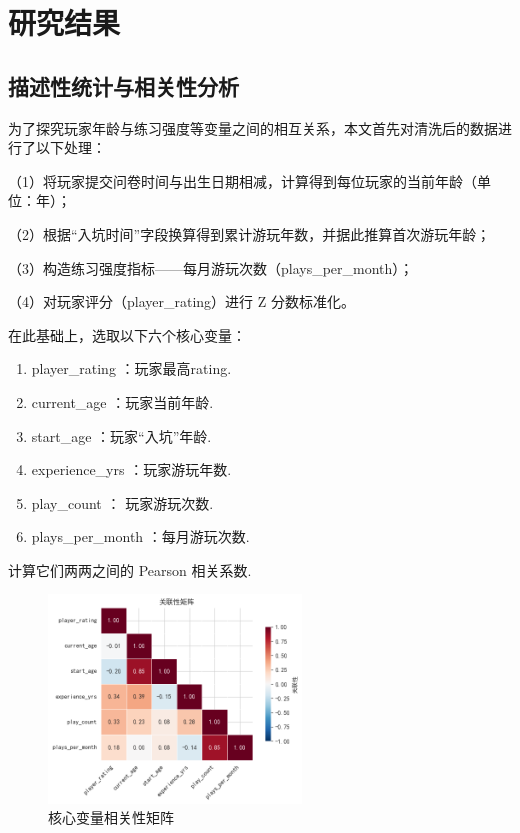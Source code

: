 \documentclass[12pt]{article}
\begin{document}
\section{研究结果}

\subsection{描述性统计与相关性分析}

为了探究玩家年龄与练习强度等变量之间的相互关系，本文首先对清洗后的数据进行了以下处理：  

（1）将玩家提交问卷时间与出生日期相减，计算得到每位玩家的当前年龄（单位：年）；  

（2）根据“入坑时间”字段换算得到累计游玩年数，并据此推算首次游玩年龄；  

（3）构造练习强度指标——每月游玩次数（plays\_per\_month）；  

（4）对玩家评分（player\_rating）进行 Z 分数标准化。  

在此基础上，选取以下六个核心变量：  

\begin{enumerate}
	\item player\_rating ：玩家最高rating.
	\item current\_age ：玩家当前年龄.
	\item start\_age ：玩家“入坑”年龄.
	\item experience\_yrs ：玩家游玩年数.
	\item play\_count ： 玩家游玩次数.
	\item plays\_per\_month ：每月游玩次数.
\end{enumerate}
计算它们两两之间的 Pearson 相关系数.

\begin{figure}[htbp]
	\centering
	\includegraphics[width=0.6\textwidth]{correlation_matrix.png}
	\caption{核心变量相关性矩阵}
	\label{fig:corr}
\end{figure}
\end{document}
